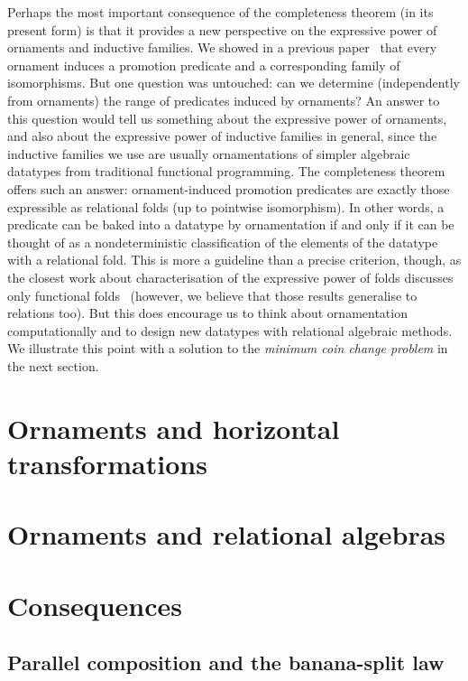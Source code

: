 Perhaps the most important consequence of the completeness theorem (in its present form) is that it provides a new perspective on the expressive power of ornaments and inductive families.
We showed in a previous paper~\cite{Ko-pcOrn} that every ornament induces a promotion predicate and a corresponding family of isomorphisms.
But one question was untouched: can we determine (independently from ornaments) the range of predicates induced by ornaments?
An answer to this question would tell us something about the expressive power of ornaments, and also about the expressive power of inductive families in general, since the inductive families we use are usually ornamentations of simpler algebraic datatypes from traditional functional programming.
The completeness theorem offers such an answer: ornament-induced promotion predicates are exactly those expressible as relational folds (up to pointwise isomorphism).
In other words, a predicate can be baked into a datatype by ornamentation if and only if it can be thought of as a nondeterministic classification of the elements of the datatype with a relational fold.
This is more a guideline than a precise criterion, though, as the closest work about characterisation of the expressive power of folds discusses only functional folds~\cite{Gibbons-kernels}
(however, we believe that those results generalise to relations too).
But this does encourage us to think about ornamentation computationally and to design new datatypes with relational algebraic methods.
We illustrate this point with a solution to the \emph{minimum coin change problem} in the next section.

\section{Ornaments and horizontal transformations}

\section{Ornaments and relational algebras}

\section{Consequences}

\subsection{Parallel composition and the banana-split law}

